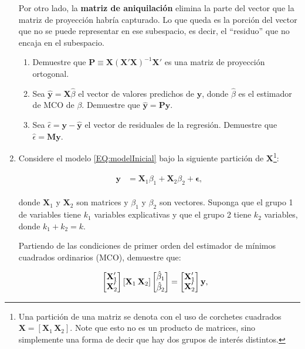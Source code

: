\documentclass[a4paper, answers, addpoints, 11pt]{exam}
\begin{document}
\begin{enumerate}
    \bigskip Por otro lado, la \textbf{matriz de aniquilación} elimina la parte del vector que la matriz de proyección habría capturado. Lo que queda es la porción del vector que no se puede representar en ese subespacio, es decir, el ``residuo'' que no encaja en el subespacio. \\
    
    \begin{enumerate}
        \item Demuestre que \(\mathbf{P} \equiv \mathbf{X}(\mathbf{X'}\mathbf{X})^{-1}\mathbf{X'}\) es una matriz de proyección ortogonal.
        \item Sea \(\mathbf{\hat{y}} = \mathbf{X}\hat\beta\) el vector de valores predichos de \(\mathbf{y}\), donde \(\hat\beta\) es el estimador de MCO de \(\beta\). Demuestre que \(\mathbf{\hat{y}} = \mathbf{P}\mathbf{y}\).
        \item Sea \(\hat{\epsilon} = \mathbf{y} - \mathbf{\hat{y}}\) el vector de residuales de la regresión. Demuestre que \(\hat{\epsilon} = \mathbf{M} \mathbf{y}\).
    \end{enumerate}
    \bigskip

    \item Considere el modelo \eqref{EQ:modelInicial} bajo la siguiente partición de $\mathbf{X}$\footnote{Una partición de una matriz se denota con el uso de corchetes cuadrados $\mathbf{X} = [\mathbf{X}_1 \, \mathbf{X}_2]$. Note que esto no es un producto de matrices, sino simplemente una forma de decir que hay dos grupos de interés distintos.}:

    \begin{align}
    \begin{split}
        \textbf{y} &= \textbf{X}_1 \beta_1 + \textbf{X}_2 \beta_2 + \boldsymbol\epsilon,
    \end{split}
    \end{align}

    donde $\textbf{X}_1$ y $\textbf{X}_2$ son matrices y $\beta_1$ y $\beta_2$ son vectores. Suponga que el grupo 1 de variables tiene $k_1$ variables explicativas y que el grupo 2 tiene $k_2$ variables, donde $k_1 + k_2 = k$.

    Partiendo de las condiciones de primer orden del estimador de mínimos cuadrados ordinarios (MCO), demuestre que:

    \begin{align*}
        \begin{bmatrix}
            \textbf{X}_{1}' \\
            \textbf{X}_{2}'
        \end{bmatrix} 
            [ \textbf{X}_1  \hspace{0.2em}  \textbf{X}_2 ]
        \begin{bmatrix}
            \hat\beta_1 \\
            \hat\beta_2
        \end{bmatrix} &= 
        \begin{bmatrix}
            \textbf{X}_{1}' \\
            \textbf{X}_{2}'
        \end{bmatrix}
        \textbf{y},
    \end{align*}


\end{enumerate}
\end{document}
